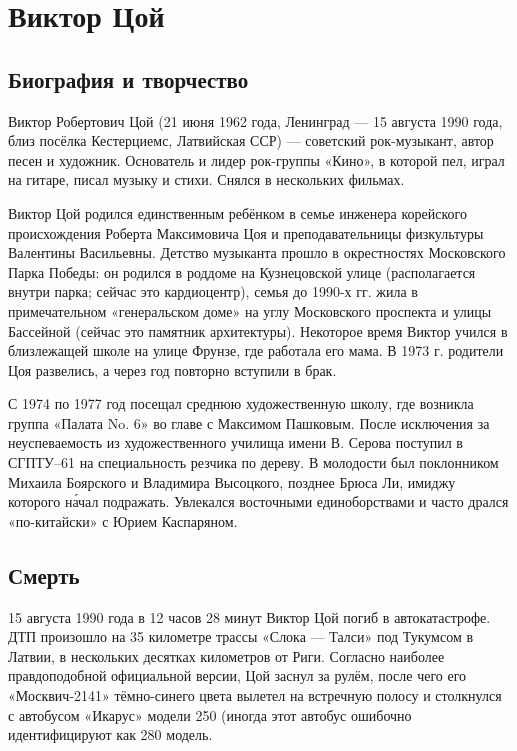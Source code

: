 \newpage
\section{Виктор Цой}
\subsection{Биография и творчество}
Виктор Робертович Цой (21 июня 1962 года, Ленинград --- 15 августа 1990 года, близ посёлка Кестерциемс, Латвийская ССР) --- советский рок-музыкант, автор песен и художник. Основатель и лидер рок-группы «Кино», в которой пел, играл на гитаре, писал музыку и стихи. Снялся в нескольких фильмах.

Виктор Цой родился единственным ребёнком в семье инженера корейского происхождения Роберта Максимовича Цоя и преподавательницы физкультуры Валентины Васильевны. Детство музыканта прошло в окрестностях Московского Парка Победы: он родился в роддоме на Кузнецовской улице (располагается внутри парка; сейчас это кардиоцентр), семья до 1990-х гг. жила в примечательном «генеральском доме» на углу Московского проспекта и улицы Бассейной (сейчас это памятник архитектуры). Некоторое время Виктор учился в близлежащей школе на улице Фрунзе, где работала его мама. В 1973 г. родители Цоя развелись, а через год повторно вступили в брак.

С 1974 по 1977 год посещал среднюю художественную школу, где возникла группа «Палата No. 6» во главе с Максимом Пашковым.
После исключения за неуспеваемость из художественного училища имени В. Серова поступил в СГПТУ--61 на специальность резчика по дереву.
В молодости был поклонником Михаила Боярского и Владимира Высоцкого, позднее Брюса Ли, имиджу которого н\'{а}чал подражать.
Увлекался восточными единоборствами и часто дрался «по-китайски» с Юрием Каспаряном.

\subsection{Смерть}
15 августа 1990 года в 12 часов 28 минут Виктор Цой погиб в автокатастрофе. ДТП произошло на 35 километре трассы «Слока --- Талси» под Тукумсом в Латвии, в нескольких десятках километров от Риги. Согласно наиболее правдоподобной официальной версии, Цой заснул за рулём, после чего его «Москвич-2141» тёмно-синего цвета вылетел на встречную полосу и столкнулся с автобусом «Икарус» модели 250 (иногда этот автобус ошибочно идентифицируют как 280 модель.


